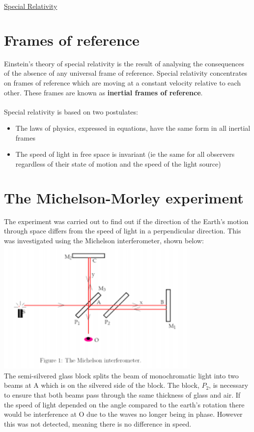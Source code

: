 \documentclass[12pt]{article}
\begin{document}
\begin{center}
\underline{\huge Special Relativity}
\end{center}
\section{Frames of reference}
Einstein's theory of special relativity is the result of analysing the consequences of the absence of any universal frame of reference. Special relativity concentrates on frames of reference which are moving at a constant velocity relative to each other. These frames are known as \textbf{inertial frames of reference}.\\
\\
Special relativity is based on two postulates:
\begin{itemize}
\item The laws of physics, expressed in equations, have the same form in all inertial frames
\item The speed of light in free space is invariant (ie the same for all observers regardless of their state of motion and the speed of the light source)
\end{itemize}
\section{The Michelson-Morley experiment}
The experiment was carried out to find out if the direction of the Earth's motion through space differs from the speed of light in a perpendicular direction. This was investigated using the Michelson interferometer, shown below:\\
\includegraphics[width=10cm]{michelson.png}\\
The semi-silvered glass block splits the beam of monochromatic light into two beams at A which is on the silvered side of the block. The block, $P_2$, is necessary to ensure that both beams pass through the same thickness of glass and air. If the speed of light depended on the angle compared to the earth's rotation there would be interference at O due to the waves no longer being in phase. However this was not detected, meaning there is no difference in speed.
\end{document}

